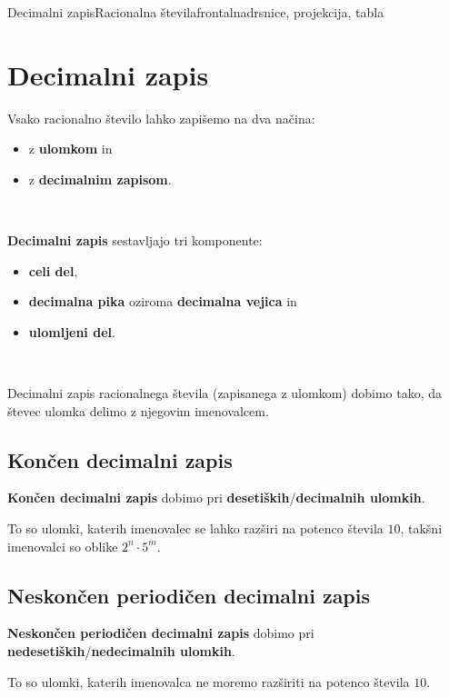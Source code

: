 \begin{priprava}{11}{}{Decimalni zapis}{Racionalna števila}{frontalna}{drsnice, projekcija, tabla}

    \section{Decimalni zapis}

    Vsako racionalno število lahko zapišemo na dva načina:
    \begin{itemize}
        \item z \textbf{ulomkom} in 
        \item z \textbf{decimalnim zapisom}.
    \end{itemize}

    ~

    \textbf{Decimalni zapis} sestavljajo tri komponente:
    \begin{itemize}
        \item \textbf{celi del},
        \item \textbf{decimalna pika} oziroma \textbf{decimalna vejica} in 
        \item \textbf{ulomljeni del}.
    \end{itemize}

    ~

    Decimalni zapis racionalnega števila (zapisanega z ulomkom) dobimo tako, 
    da števec ulomka delimo z njegovim imenovalcem.



    \subsection*{Končen decimalni zapis}
    
    \textbf{Končen decimalni zapis} dobimo pri \textbf{desetiških}/\textbf{decimalnih ulomkih}. 
    
    To so ulomki, katerih imenovalec se lahko razširi na potenco števila $10$, takšni imenovalci so oblike $2^n\cdot 5^m$.

    

    \subsection*{Neskončen periodičen decimalni zapis}
    
    \textbf{Neskončen periodičen decimalni zapis} dobimo pri \textbf{nedesetiških}/\textbf{nedecimalnih ulomkih}. 
    
    To so ulomki, katerih imenovalca ne moremo razširiti na potenco števila $10$.


\end{priprava}
